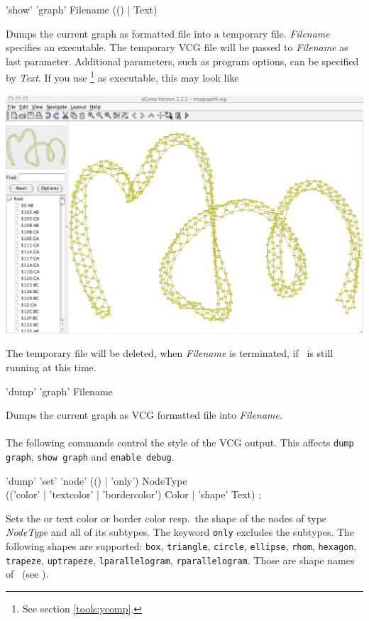 \begin{rail}
  'show' 'graph' Filename (() | Text)
\end{rail}
Dumps the current graph as  formatted file into a temporary file. \emph{Filename} specifies an executable. The temporary VCG file will be passed to \emph{Filename} as last parameter. Additional parameters, such as program options, can be specified by \emph{Text}. If you use \yComp\footnote{See section \ref{tools:ycomp}.} as executable, this may look like
\begin{center}
  \includegraphics[width=0.75\linewidth]{fig/showgraph}
\end{center}  
The temporary file will be deleted, when \emph{Filename} is terminated, if \GrShell\ is still running at this time.

\begin{rail}
  'dump' 'graph' Filename
\end{rail}
Dumps the current graph as VCG formatted file into \emph{Filename}.\\
\\
The following commands control the style of the VCG output. This affects \texttt{dump graph}, \texttt{show graph} and \texttt{enable debug}. 
\begin{rail}
  'dump' 'set' 'node' (() | 'only') NodeType \\ (('color' | 'textcolor' | 'bordercolor') Color | 'shape' Text) ;
\end{rail}
Sets the  or text color or border color resp.\ the shape of the nodes of type \emph{NodeType} and all of its subtypes. The keyword \texttt{only} excludes the subtypes. The following shapes are supported: \texttt{box}, \texttt{triangle}, \texttt{circle}, \texttt{ellipse}, \texttt{rhom}, \texttt{hexagon}, \texttt{trapeze}, \texttt{uptrapeze}, \texttt{lparallelogram}, \texttt{rparallelogram}. Those are shape names of \yComp\ (see \cite{}).

